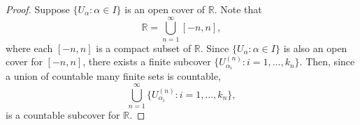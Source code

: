 \documentclass[12pt]{article}
\newcommand{\R}{\mathbb{R}}
\begin{document}
\begin{proof}
    Suppose $\{U_\alpha : \alpha \in I\}$ is an open cover of $\R$. Note that
    \[\R= \bigcup_{n=1}^\infty[-n,n],\]
    where each $[-n,n]$ is a compact subset of $\R$. Since $\{U_\alpha : \alpha\in I\}$ is also an open cover for $[-n,n]$, there exists a finite subcover $\{U^{(n)}_{\alpha_i} : i=1,\dots, k_n\}$. Then, since a union of countable many finite sets is countable,
    \[\bigcup_{n=1}^\infty\{U^{(n)}_{\alpha_i} : i=1,\dots, k_n\},\]
    is a countable subcover for $\R$.
    
\end{proof}
\end{document}
